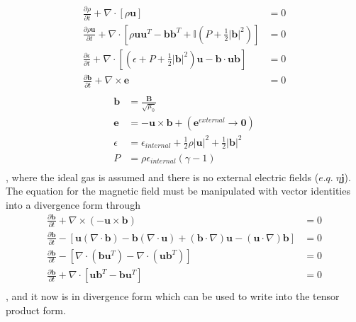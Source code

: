 \documentclass[paper=a4, fontsize=11pt]{scrartcl}
\newcommand{\pfrac}[2]{\frac{\partial#1}{\partial#2}}
\numberwithin{equation}{section}                %
\numberwithin{figure}{section}                  %
\numberwithin{table}{section}                           %
\begin{document}
\minipage{\textwidth}
  \begin{align*}
    \pfrac{\rho}{t} + \nabla \cdot \left[\rho \mathbf{u}\right] &= 0 \\
    \pfrac{\rho \mathbf{u}}{t} + \nabla \cdot \left[\rho \mathbf{u}\mathbf{u}^T - \mathbf{b}\mathbf{b}^T + \mathbb{I}\left(P + \frac{1}{2}|\mathbf{b}|^2\right)\right] &= 0 \\
    \pfrac{\epsilon}{t} + \nabla \cdot \left[\left(\epsilon + P + \frac{1}{2}|\mathbf{b}|^2\right)\mathbf{u}- \mathbf{b}\cdot\mathbf{u}\mathbf{b}\right] &= 0 \\
    \pfrac{\mathbf{b}}{t} + \nabla\times\mathbf{e} &= 0 \\
  \end{align*}
  \endminipage\hfill
  \begin{align*}
    \mathbf{b} &= \frac{\mathbf{B}}{\sqrt{\mu_0}} \\
    \mathbf{e} &= - \mathbf{u} \times \mathbf{b} +\left(\mathbf{e}^{external}\rightarrow\mathbf{0}\right)\\
    \epsilon &= \epsilon_{internal} + \frac{1}{2}\rho|\mathbf{u}|^2 + \frac{1}{2}|\mathbf{b}|^2\\
    P &=\rho \epsilon_{internal} (\gamma - 1) \\
  \end{align*}
  \endminipage\hfill
  \endminipage, where the ideal gas is assumed and there is no external electric fields ($e.q.\;\eta \mathbf{j}$). The equation for the magnetic field must be manipulated with vector identities into a divergence form through
  \begin{align*}
    \pfrac{\mathbf{b}}{t} + \nabla\times(-\mathbf{u}\times\mathbf{b}) &= 0\\
    \pfrac{\mathbf{b}}{t} - \left[\mathbf{u}(\nabla\cdot\mathbf{b})-\mathbf{b}(\nabla\cdot\mathbf{u})+(\mathbf{b}\cdot \nabla)\mathbf{u}-(\mathbf{u}\cdot\nabla)\mathbf{b}\right] &= 0\\
    \pfrac{\mathbf{b}}{t} - \left[\nabla\cdot(\mathbf{b}\mathbf{u}^T)-\nabla\cdot(\mathbf{u}\mathbf{b}^T)\right] &= 0\\
    \pfrac{\mathbf{b}}{t} + \nabla\cdot\left[\mathbf{u}\mathbf{b}^T-\mathbf{b}\mathbf{u}^T\right] &= 0\\
  \end{align*}, and it now is in divergence form which can be used to write into the tensor product form.
\end{document}

